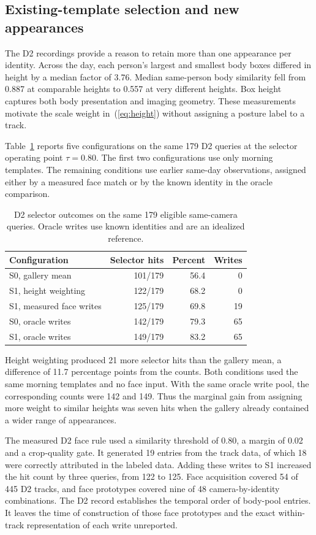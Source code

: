 \documentclass[journal,letterpaper]{IEEEtran}
\begin{document}
\subsection{Existing-template selection and new appearances}
The D2 recordings provide a reason to retain more than one appearance per identity. Across the day, each person's largest and smallest body boxes differed in height by a median factor of 3.76. Median same-person body similarity fell from 0.887 at comparable heights to 0.557 at very different heights. Box height captures both body presentation and imaging geometry. These measurements motivate the scale weight in~(\ref{eq:height}) without assigning a posture label to a track.

Table~\ref{tab:selector} reports five configurations on the same 179 D2 queries at the selector operating point $\tau=0.80$. The first two configurations use only morning templates. The remaining conditions use earlier same-day observations, assigned either by a measured face match or by the known identity in the oracle comparison.

\begin{table}[t]
\caption{D2 selector outcomes on the same 179 eligible same-camera queries. Oracle writes use known identities and are an idealized reference.}
\label{tab:selector}
\centering
\setlength{\tabcolsep}{3pt}
\begin{tabular}{@{}lrrr@{}}
\toprule
Configuration & Selector hits & Percent & Writes\\
\midrule
S0, gallery mean & 101/179 & 56.4 & 0\\
S1, height weighting & 122/179 & 68.2 & 0\\
S1, measured face writes & 125/179 & 69.8 & 19\\
S0, oracle writes & 142/179 & 79.3 & 65\\
S1, oracle writes & 149/179 & 83.2 & 65\\
\bottomrule
\end{tabular}
\end{table}

Height weighting produced 21 more selector hits than the gallery mean, a difference of 11.7 percentage points from the counts. Both conditions used the same morning templates and no face input. With the same oracle write pool, the corresponding counts were 142 and 149. Thus the marginal gain from assigning more weight to similar heights was seven hits when the gallery already contained a wider range of appearances.

The measured D2 face rule used a similarity threshold of 0.80, a margin of 0.02 and a crop-quality gate. It generated 19 entries from the track data, of which 18 were correctly attributed in the labeled data. Adding these writes to S1 increased the hit count by three queries, from 122 to 125. Face acquisition covered 54 of 445 D2 tracks, and face prototypes covered nine of 48 camera-by-identity combinations. The D2 record establishes the temporal order of body-pool entries. It leaves the time of construction of those face prototypes and the exact within-track representation of each write unreported.
\end{document}
